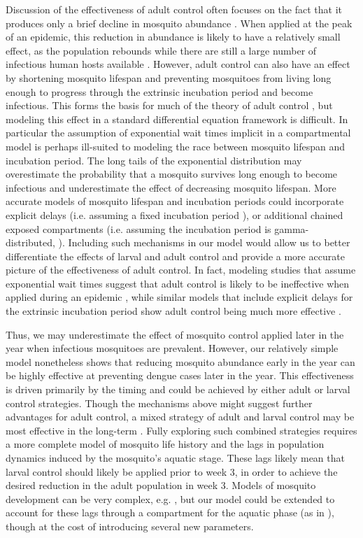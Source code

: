 \documentclass[10pt,letterpaper]{article}
\begin{document}
Discussion of the effectiveness of adult control often focuses on the fact that it produces only a brief decline in mosquito abundance \cite{Newton1992, Esu2010}.
When applied at the peak of an epidemic, this reduction in abundance is likely to have a relatively small effect, as the population rebounds while there are still a large number of infectious human hosts available \cite{Newton1992, Burattini2008}. 
However, adult control can also have an effect by shortening mosquito lifespan and preventing mosquitoes from living long enough to progress through the extrinsic incubation period and become infectious.
This forms the basis for much of the theory of adult control \cite{Burattini2008, Morrison2008, Smith2012}, but modeling this effect in a standard differential equation framework is difficult.
In particular the assumption of exponential wait times implicit in a compartmental model is perhaps ill-suited to modeling the race between mosquito lifespan and incubation period.
The long tails of the exponential distribution may overestimate the probability that a mosquito survives long enough to become infectious and underestimate the effect of decreasing mosquito lifespan.
More accurate models of mosquito lifespan and incubation periods could incorporate explicit delays (i.e. assuming a fixed incubation period \cite{Burattini2008}), or additional chained exposed compartments (i.e. assuming the incubation period is gamma-distributed, \cite{Lloyd2001}).
Including such mechanisms in our model would allow us to better differentiate the effects of larval and adult control and provide a more accurate picture of the effectiveness of adult control.
In fact, modeling studies that assume exponential wait times suggest that adult control is likely to be ineffective when applied during an epidemic \cite{Newton1992, Pinho2010}, while similar models that include explicit delays for the extrinsic incubation period show adult control being much more effective \cite{Burattini2008}.

Thus, we may underestimate the effect of mosquito control applied later in the year when infectious mosquitoes are prevalent.
However, our relatively simple model nonetheless shows that reducing mosquito abundance early in the year can be highly effective at preventing dengue cases later in the year.
This effectiveness is driven primarily by the timing and could be achieved by either adult or larval control strategies.
Though the mechanisms above might suggest further advantages for adult control, a mixed strategy of adult and larval control may be most effective in the long-term \cite{Burattini2008, Pinho2010}.
Fully exploring such combined strategies requires a more complete model of mosquito life history and the lags in population dynamics induced by the mosquito's aquatic stage.
These lags likely mean that larval control should likely be applied prior to week 3, in order to achieve the desired reduction in the adult population in week 3.
Models of mosquito development can be very complex, e.g. \cite{Magori2009}, but our model could be extended to account for these lags through a compartment for the aquatic phase (as in \cite{Burattini2008, Pinho2010}), though at the cost of introducing several new parameters.
\end{document}
